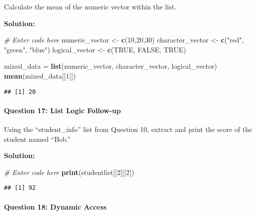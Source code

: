 \documentclass[
]{article}
\newenvironment{Shaded}{\begin{snugshade}}{\end{snugshade}}
\newcommand{\CommentTok}[1]{\textcolor[rgb]{0.56,0.35,0.01}{\textit{#1}}}
\newcommand{\ConstantTok}[1]{\textcolor[rgb]{0.56,0.35,0.01}{#1}}
\newcommand{\DecValTok}[1]{\textcolor[rgb]{0.00,0.00,0.81}{#1}}
\newcommand{\FunctionTok}[1]{\textcolor[rgb]{0.13,0.29,0.53}{\textbf{#1}}}
\newcommand{\NormalTok}[1]{#1}
\newcommand{\OtherTok}[1]{\textcolor[rgb]{0.56,0.35,0.01}{#1}}
\newcommand{\StringTok}[1]{\textcolor[rgb]{0.31,0.60,0.02}{#1}}
\begin{document}
Calculate the mean of the numeric vector within the list.

\textbf{Solution:}

\begin{Shaded}
\begin{Highlighting}[]
\CommentTok{\# Enter code here}
\NormalTok{numeric\_vector }\OtherTok{\textless{}{-}} \FunctionTok{c}\NormalTok{(}\DecValTok{10}\NormalTok{,}\DecValTok{20}\NormalTok{,}\DecValTok{30}\NormalTok{)}
\NormalTok{character\_vector }\OtherTok{\textless{}{-}} \FunctionTok{c}\NormalTok{(}\StringTok{"red"}\NormalTok{, }\StringTok{"green"}\NormalTok{, }\StringTok{"blue"}\NormalTok{)}
\NormalTok{logical\_vector }\OtherTok{\textless{}{-}} \FunctionTok{c}\NormalTok{(}\ConstantTok{TRUE}\NormalTok{, }\ConstantTok{FALSE}\NormalTok{, }\ConstantTok{TRUE}\NormalTok{)}

\NormalTok{mixed\_data }\OtherTok{=} \FunctionTok{list}\NormalTok{(numeric\_vector, character\_vector, logical\_vector)}
\FunctionTok{mean}\NormalTok{(mixed\_data[[}\DecValTok{1}\NormalTok{]])}
\end{Highlighting}
\end{Shaded}

\begin{verbatim}
## [1] 20
\end{verbatim}

\hypertarget{question-17-list-logic-follow-up}{%
\paragraph{Question 17: List Logic
Follow-up}\label{question-17-list-logic-follow-up}}

Using the ``student\_info'' list from Question 10, extract and print the
score of the student named ``Bob.''

\textbf{Solution:}

\begin{Shaded}
\begin{Highlighting}[]
\CommentTok{\# Enter code here}
\FunctionTok{print}\NormalTok{(studentlist[[}\DecValTok{2}\NormalTok{]][}\DecValTok{2}\NormalTok{])}
\end{Highlighting}
\end{Shaded}

\begin{verbatim}
## [1] 92
\end{verbatim}

\hypertarget{question-18-dynamic-access}{%
\paragraph{Question 18: Dynamic
Access}\label{question-18-dynamic-access}}
\end{document}
